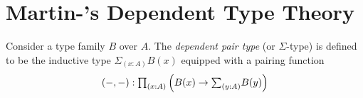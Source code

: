 \section{Martin-\Lof's Dependent Type Theory}\label{sec:dtt}



\begin{definition}
    Consider a type family $B$ over $A$.
    The \emph{dependent pair type} (or $\Sigma$-type) is defined to be the inductive type $\Sigma_{(x:A)} B(x)$ equipped with a pairing function
    \[
        (-,-) :\textstyle\mathbf{\prod}_{(x:A)}  \left\lparen B(x)\to\textstyle\mathbf{\sum}_{(y:A)}B(y) \right\rparen
    \]
\end{definition}